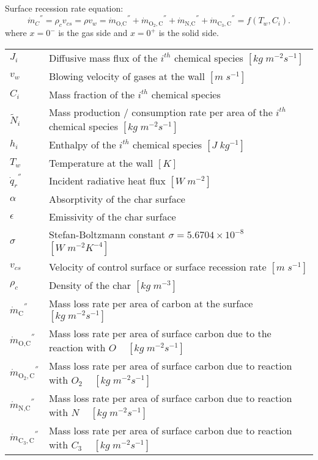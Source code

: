 \documentclass[10pt]{article}
\newcommand{\C}{\text{C}}
\newcommand{\Oo}{\text{O}}
\newcommand{\N}{\text{N}}
\begin{document}
Surface recession rate equation:
\begin{equation}\label{eq:non_charring_recession_rate}
 {\dot{m}_C}^{''} = \rho_{c} v_{cs} = \rho v_w = {\dot{m}_{\Oo,\C}}^{''} + {\dot{m}_{\Oo_2,\C}}^{''} + {\dot{m}_{\N,\C}}^{''} + {\dot{m}_{\C_3,\C}}^{''}=f(T_w,C_i) .
\end{equation}
where $x=0^-$ is the gas side and $x=0^+$ is the solid side.\\

\begin{tabular}{|p{1.5cm} p{13.5cm}|}
\hline
\small
  $J_i$ & Diffusive mass flux of the $i^{th}$ chemical species $[kg\;m^{-2}s^{-1}]$ \\
  $v_w$ & Blowing velocity of gases at the wall $[m\;s^{-1}]$ \\
  $C_i$ & Mass fraction of the $i^{th}$ chemical species \\
  $\tilde{N}_i$ & Mass production / consumption rate per area of the $i^{th}$ chemical species $[kg\;m^{-2} s^{-1}]$ \\
  $h_i$ & Enthalpy of the $i^{th}$ chemical species $[J\;kg^{-1}]$ \\
  $T_w$ & Temperature at the wall $[K]$ \\
  ${\dot{q}_r}^{''}$ & Incident radiative heat flux $[W\;m^{-2}]$ \\
  $ \alpha $ & Absorptivity of the char surface \\
  $ \epsilon $ & Emissivity of the char surface \\
  $ \sigma $ & Stefan-Boltzmann constant $\sigma = 5.6704 \times 10^{-8}$ ~ $[W\;m^{-2}K^{-4}]$ \\
  $v_{cs}$ & Velocity of control surface or surface recession rate $[m\;s^{-1}]$ \\
  $\rho_{c}$ & Density of the char $[kg\;m^{-3}]$ \\
  ${\dot{m}_\C}^{''}$ & Mass loss rate per area of carbon at the surface $[kg\;m^{-2} s^{-1}]$ \\
  ${\dot{m}_{\Oo,\C}}^{''}$ & Mass loss rate per area of surface carbon due to the reaction with $O$ ~ $[kg\;m^{-2} s^{-1}]$ \\
  ${\dot{m}_{\Oo_2,\C}}^{''}$ & Mass loss rate per area of surface carbon due to reaction with $O_2$ ~ $[kg\;m^{-2} s^{-1}]$ \\
  ${\dot{m}_{\N,\C}}^{''}$ & Mass loss rate per area of surface carbon due to reaction with $N$ ~ $[kg\;m^{-2} s^{-1}]$ \\
  ${\dot{m}_{\C_3,\C}}^{''}$ & Mass loss rate per area of surface carbon due to reaction with $C_3$ ~ $[kg\;m^{-2} s^{-1}]$ \\
  


\hline
\end{tabular}
\end{document}
